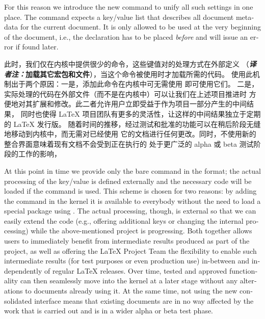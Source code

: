 \documentclass{ltnews}
\newcommand{\itransnote}[1]{（{\bfseries \textit{译者注：}#1}）}
\begin{document}
\begin{english}
For this reason we introduce the new command  to
unify all such settings in one place.  The command expects a key/value
list that describes all document metadata for the current document. It
is only allowed to be used at the very beginning of the document,
i.e., the declaration has to be placed \emph{before}
 and will issue an error if found later.
\end{english}

此时，我们仅在内核中提供很少的命令，这些键值对的处理方式在外部定义%
\itransnote{加载其它宏包和文件}，当这个命令被使用时才加载所需的代码。
使用此机制出于两个原因：一是，添加此命令在内核中可无需使用  即可使用它们。
二是，实际处理的代码在外部文件（而不是在内核中）可以让我们在上述项目推进时
方便地对其扩展和修改。此二者允许用户立即受益于作为项目一部分产生的中间结果，
同时也使得 \LaTeX{} 项目团队有更多的灵活性，让这样的中间结果独立于定期的 \LaTeX{} 发行版。
随着时间的推移，经过测试和批准的功能可以在稍后阶段无缝地移动到内核中，而无需对已经使用
它的文档进行任何更改。同时，不使用新的整合界面意味着现有文档不会受到正在执行的
处于更广泛的 alpha 或 beta 测试阶段的工作的影响，

\begin{english}
At this point in time we provide only the bare command in the format;
the actual processing of the key/value is defined externally and the
necessary code will be loaded if the command is used. This scheme is
chosen for two reasons: by adding the command in the kernel it is
available to everybody without the need to load a special package
using . The actual processing, though, is external
so that we can easily extend the code (e.g., offering additional keys
or changing the internal processing) while the above-mentioned project
is progressing. Both together allows users to immediately benefit from
intermediate results produced as part of the project, as well as
offering the \LaTeX{} Project Team the flexibility to enable such
intermediate results (for test purposes or even production use)
in-between and independently of regular \LaTeX{} releases. Over time,
tested and approved functionality can then seamlessly move into the
kernel at a later stage without any alterations to documents already
using it. At the same time, not using the new consolidated interface
means that existing documents are in no way affected by the work that
is carried out and is in a wider alpha or beta test phase.
\end{english}
\end{document}
